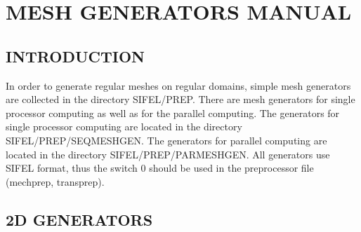 \documentclass[12pt]{book}
\begin{document}
\tableofcontents
\chapter {MESH GENERATORS MANUAL}

\section{INTRODUCTION}

In order to generate regular meshes on regular domains, simple mesh
generators are collected in the directory SIFEL/PREP.
There are mesh generators for single processor
computing as well as for the parallel computing.
The generators for single processor computing are located in the directory SIFEL/PREP/SEQMESHGEN.
The generators for parallel computing are located in the directory SIFEL/PREP/PARMESHGEN. 
All generators use SIFEL format, thus the switch 0 should be used
in the preprocessor file (mechprep, transprep).


\section {2D GENERATORS}
\end{document}
